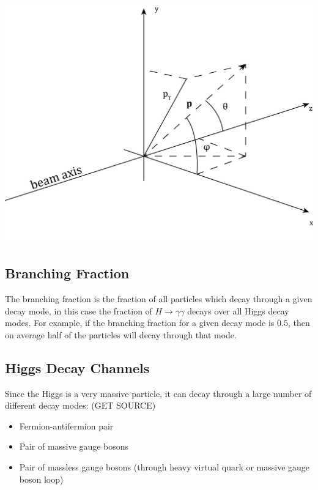 \documentclass[11pt]{amsart}
\makeatletter
\newenvironment{figurehere}
  {\def\@captype{figure}}
  {}
\makeatother
\begin{document}
\begin{multicols}{2}
\begin{figurehere}
  \centering
  \includegraphics[width=\linewidth]{kinematics}
  \label{fig:kinematics}
\end{figurehere}

\subsection{Branching Fraction}
\label{sec:branching}

The branching fraction is the fraction of all particles which decay through a given decay mode, in this case the fraction of $H \to \gamma\gamma$ decays over all Higgs decay modes. For example, if the branching fraction for a given decay mode is $0.5$, then on average half of the particles will decay through that mode.

\subsection{Higgs Decay Channels}

Since the Higgs is a very massive particle, it can decay through a large number of different decay modes: (GET SOURCE)

\begin{itemize}
    \item Fermion-antifermion pair
    \item Pair of massive gauge bosons
    \item Pair of massless gauge bosons (through heavy virtual quark or massive gauge boson loop)
\end{itemize}


\end{multicols}
\end{document}
